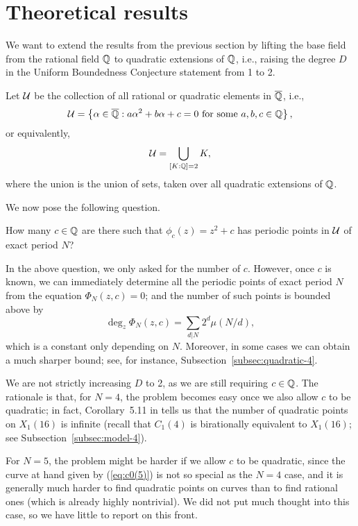 \section{Theoretical results}
\label{sec:th}

We want to extend the results from the previous section by lifting the
base field from the rational field $\mathbb{Q}$ to quadratic extensions of
$\mathbb{Q}$, i.e., raising the degree $D$ in the Uniform Boundedness
Conjecture statement from 1 to 2.

Let $\mathcal{U}$ be the collection of all rational or quadratic elements in
$\overline{\mathbb{Q}}$, i.e.,
\[
\mathcal{U} = \left\{\alpha \in \overline{\mathbb{Q}}: \text{$a \alpha^2 + b \alpha + c = 0$
    for some $a, b, c \in \mathbb{Q}$}\right\},
\]
or equivalently,
\[
\mathcal{U} = \bigcup_{[K : \mathbb{Q}] = 2}K,
\]
where the union is the union of sets, taken over all quadratic
extensions of $\mathbb{Q}$.

We now pose the following question.

\begin{question}
  \label{question}
  How many $c \in \mathbb{Q}$ are there such that $\phi_c(z) = z^2 + c$ has
  periodic points in $\mathcal{U}$ of exact period $N$?
\end{question}

\begin{remark}
  In the above question, we only asked for the number of $c$. However,
  once $c$ is known, we can immediately determine all the periodic
  points of exact period $N$ from the equation $\Phi_N(z, c) = 0$; and
  the number of such points is bounded above by
  \[
  \deg_z \Phi_N(z, c) = \sum_{d|N}2^d \mu(N/d),
  \]
  which is a constant only depending on $N$. Moreover, in some cases
  we can obtain a much sharper bound; see, for instance,
  Subsection~\ref{subsec:quadratic-4}.
\end{remark}

\begin{remark}
  We are not strictly increasing $D$ to 2, as we are still requiring
  $c \in \mathbb{Q}$. The rationale is that, for $N = 4$, the problem becomes
  easy once we also allow $c$ to be quadratic; in fact, Corollary~5.11
  in \cite{2013arXiv1308.3267B} tells us that the number of quadratic
  points on $X_1(16)$ is infinite (recall that $C_1(4)$ is
  birationally equivalent to $X_1(16)$; see
  Subsection~\ref{subsec:model-4}).

  For $N = 5$, the problem might be harder if we allow $c$ to be
  quadratic, since the curve at hand given by (\ref{eq:c0(5)}) is not
  so special as the $N = 4$ case, and it is generally much harder to
  find quadratic points on curves than to find rational ones (which is
  already highly nontrivial). We did not put much thought into this
  case, so we have little to report on this front.
\end{remark}

